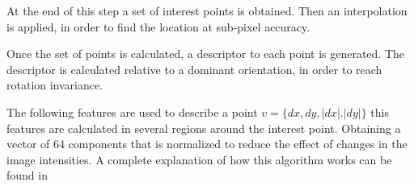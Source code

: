 At the end of this step a set of interest points is obtained. Then an interpolation is applied, in order to find the location 
at sub-pixel accuracy.

Once the set of points is calculated, a descriptor to each point is generated. The descriptor is calculated relative to a dominant 
orientation, in order to reach rotation invariance.
 
The following features are used to describe a point $v=\{dx,dy,|dx|.|dy|\}$ this features are calculated in several regions 
around the interest point. Obtaining a vector of 64 components that is normalized to reduce the effect of changes in the image 
intensities. A complete explanation of how this algorithm works can be found in \cite{OpenSURF}



